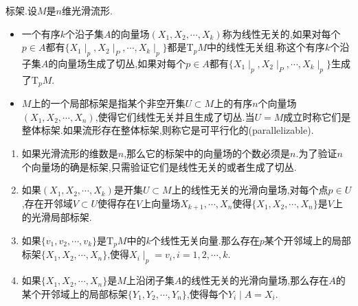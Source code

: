 标架.设$M$是$n$维光滑流形.
\begin{itemize}
	\item 一个有序$k$个沿子集$A$的向量场$(X_1,X_2,\cdots,X_k)$称为线性无关的,如果对每个$p\in A$都有$\{X_1\mid_p,X_2\mid_P,\cdots,X_k\mid_p\}$都是$\mathrm{T}_pM$中的线性无关组.称这个有序$k$个沿子集$A$的向量场生成了切丛,如果对每个$p\in A$都有$\{X_1\mid_p,X_2\mid_P,\cdots,X_k\mid_p\}$生成了$\mathrm{T}_pM$.
	\item $M$上的一个局部标架是指某个非空开集$U\subset M$上的有序$n$个向量场$(X_1,X_2,\cdots,X_n)$,使得它们线性无关并且生成了切丛.当$U=M$成立时称它们是整体标架.如果流形存在整体标架,则称它是可平行化的(parallelizable).
\end{itemize}
\begin{enumerate}
	\item 如果光滑流形的维数是$n$,那么它的标架中的向量场的个数必须是$n$.为了验证$n$个向量场的确是标架,只需验证它们是线性无关的或者生成了切丛.
	\item 如果$(X_1,X_2,\cdots,X_k)$是开集$U\subset M$上的线性无关的光滑向量场,对每个点$p\in U$,存在开邻域$V\subset U$使得存在$V$上向量场$X_{k+1},\cdots,X_n$使得$\{X_1,X_2,\cdots,X_n\}$是$V$上的光滑局部标架.
	\item 如果$\{v_1,v_2,\cdots,v_k\}$是$\mathrm{T}_pM$中的$k$个线性无关向量.那么存在$p$某个开邻域上的局部标架$\{X_1,X_2,\cdots,X_n\}$,使得$X_i\mid_p=v_i,i=1,2,\cdots,k$.
	\item 如果$\{X_1,X_2,\cdots,X_n\}$是$M$上沿闭子集$A$的线性无关的光滑向量场,那么存在$A$的某个开邻域上的局部标架$\{Y_1,Y_2,\cdots,Y_n\}$,使得每个$Y_i\mid A=X_i$.
\end{enumerate}

